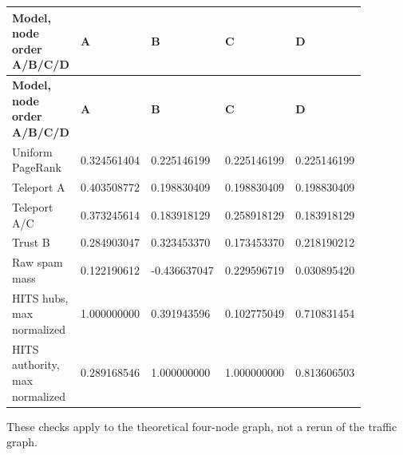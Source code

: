 \documentclass[11pt,a4paper]{article}
\begin{document}
\begingroup\small\setlength{\tabcolsep}{3pt}\renewcommand{\arraystretch}{1.2}
\begin{longtable}{@{}p{0.1760\linewidth}p{0.1760\linewidth}p{0.1760\linewidth}p{0.1760\linewidth}p{0.1760\linewidth}@{}}
\toprule
\textbf{Model, node order A/\allowbreak{}B/\allowbreak{}C/\allowbreak{}D} & \textbf{A} & \textbf{B} & \textbf{C} & \textbf{D} \\ \midrule
\endfirsthead
\textbf{Model, node order A/\allowbreak{}B/\allowbreak{}C/\allowbreak{}D} & \textbf{A} & \textbf{B} & \textbf{C} & \textbf{D} \\ \midrule \endhead
Uniform PageRank & 0.324561404 & 0.225146199 & 0.225146199 & 0.225146199 \\
Teleport A & 0.403508772 & 0.198830409 & 0.198830409 & 0.198830409 \\
Teleport A/\allowbreak{}C & 0.373245614 & 0.183918129 & 0.258918129 & 0.183918129 \\
Trust B & 0.284903047 & 0.323453370 & 0.173453370 & 0.218190212 \\
Raw spam mass & 0.122190612 & -0.436637047 & 0.229596719 & 0.030895420 \\
HITS hubs, max normalized & 1.000000000 & 0.391943596 & 0.102775049 & 0.710831454 \\
HITS authority, max normalized & 0.289168546 & 1.000000000 & 1.000000000 & 0.813606503 \\
\bottomrule\end{longtable}\endgroup

These checks apply to the theoretical four-node graph, not a rerun of the traffic graph.
\end{document}
